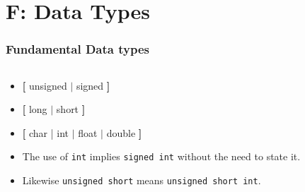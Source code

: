 \section{F: Data Types}


\begin{frame}[fragile]
\frametitle{Fundamental Data types}

\begin{columns}

\begin{column}[c]{0.35\textwidth}
{\small
\begin{itemize}[<+->]
\item {\bf [} unsigned $|$ signed {\bf ]}
\item {\bf [} long $|$ short {\bf ]}
\item {\bf [} char | int $|$ float $|$ double {\bf ]}
\item The use of {\tt int} implies {\tt signed int} without the need to state it.
\item Likewise {\tt unsigned short} means {\tt unsigned short int}.
\end{itemize}
}
\end{column}


\end{columns}
\end{frame}
